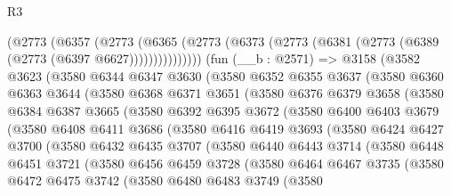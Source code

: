 \begin{lexlean}{R3}
\begin{coremodule}
          (@2773
            (@6357
              (@2773
                (@6365 (@2773 (@6373 (@2773 (@6381 (@2773 (@6389 (@2773 (@6397 @6627)))))))))))))))
    (fun (__b : @2571) =>
    @3158
      (@3582
        @3623
        (@3580
          @6344
          @6347
          @3630
          (@3580
            @6352
            @6355
            @3637
            (@3580
              @6360
              @6363
              @3644
              (@3580
                @6368
                @6371
                @3651
                (@3580
                  @6376
                  @6379
                  @3658
                  (@3580
                    @6384
                    @6387
                    @3665
                    (@3580
                      @6392
                      @6395
                      @3672
                      (@3580
                        @6400
                        @6403
                        @3679
                        (@3580
                          @6408
                          @6411
                          @3686
                          (@3580
                            @6416
                            @6419
                            @3693
                            (@3580
                              @6424
                              @6427
                              @3700
                              (@3580
                                @6432
                                @6435
                                @3707
                                (@3580
                                  @6440
                                  @6443
                                  @3714
                                  (@3580
                                    @6448
                                    @6451
                                    @3721
                                    (@3580
                                      @6456
                                      @6459
                                      @3728
                                      (@3580
                                        @6464
                                        @6467
                                        @3735
                                        (@3580
                                          @6472
                                          @6475
                                          @3742
                                          (@3580
                                            @6480
                                            @6483
                                            @3749
                                            (@3580

\end{coremodule}
\end{lexlean}
